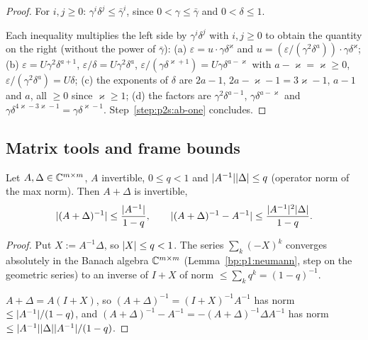 \begin{proof}
\label{step:p2s:ab-one}
For $i,j\ge0$: $\gamma^i\delta^j\le\bar\gamma^i$, since $0<\gamma\le\bar\gamma$ and $0<\delta\le1$.

\label{step:p2s:ab-exp}
Each inequality multiplies the left side by $\gamma^i\delta^j$ with $i,j\ge0$ to obtain the quantity on the right
(without the power of $\bar\gamma$): (a) $\varepsilon=u\cdot\gamma\delta^\varkappa$ and $u=(\varepsilon/(\gamma^2\delta^a))\cdot\gamma\delta^\varkappa$;
(b) $\varepsilon=U\gamma^2\delta^{a+1}$, $\varepsilon/\delta=U\gamma^2\delta^a$, $\varepsilon/(\gamma\delta^{\varkappa+1})=U\gamma\delta^{a-\varkappa}$ with
$a-\varkappa=\varkappa\ge0$, $\varepsilon/(\gamma^2\delta^a)=U\delta$; (c) the exponents of $\delta$ are $2a-1$, $2a-\varkappa-1=3\varkappa-1$,
$a-1$ and $a$, all $\ge0$ since $\varkappa\ge1$; (d) the factors are $\gamma^2\delta^{a-1}$, $\gamma\delta^{a-\varkappa}$ and
$\gamma\delta^{4\varkappa-3\varkappa-1}=\gamma\delta^{\varkappa-1}$. Step~\ref{step:p2s:ab-one} concludes.
\end{proof}

\subsection{Matrix tools and frame bounds}\label{bp:p2s:sec-tools}

\begin{lemma}\label{bp:p2s:neumann}
Let $A,\Delta\in\mathbb{C}^{m\times m}$, $A$ invertible, $0\le q<1$ and $\lvert A^{-1}\rvert\lvert \Delta\rvert\le q$ (operator norm of
the max norm). Then $A+\Delta$ is invertible,
\[
\lvert (A+\Delta)^{-1}\rvert\le\frac{\lvert A^{-1}\rvert}{1-q},\qquad\lvert (A+\Delta)^{-1}-A^{-1}\rvert\le\frac{\lvert A^{-1}\rvert^2\lvert \Delta\rvert}{1-q}.
\]
\end{lemma}

\begin{proof}
\label{step:p2s:nm-inv}
Put $X:=A^{-1}\Delta$, so $\lvert X\rvert\le q<1$. The series $\sum_k(-X)^k$ converges absolutely in the Banach algebra
$\mathbb{C}^{m\times m}$ (Lemma~\ref{bp:p1:neumann}, step on the geometric series) to an inverse of $I+X$ of norm
$\le\sum_kq^k=(1-q)^{-1}$.

\label{step:p2s:nm-bounds}
$A+\Delta=A(I+X)$, so $(A+\Delta)^{-1}=(I+X)^{-1}A^{-1}$ has norm $\le\lvert A^{-1}\rvert/(1-q)$, and
$(A+\Delta)^{-1}-A^{-1}=-(A+\Delta)^{-1}\Delta A^{-1}$ has norm $\le\lvert A^{-1}\rvert\lvert \Delta\rvert\lvert A^{-1}\rvert/(1-q)$.
\end{proof}

